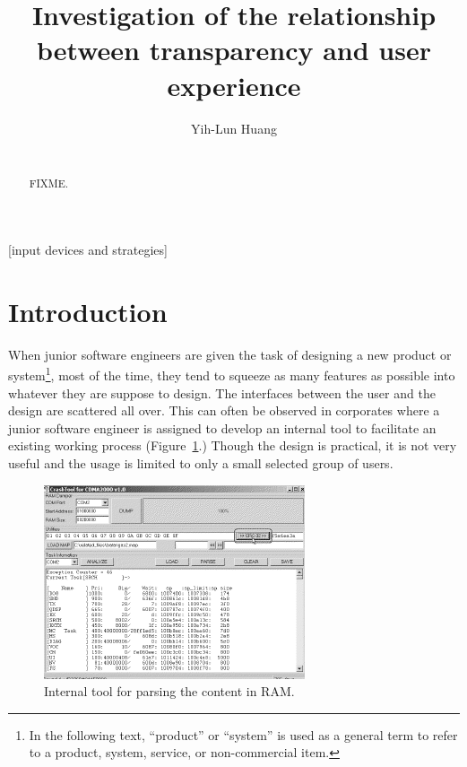 \documentclass{acm_proc_article-sp}
\begin{document}
\title{Investigation of the relationship between transparency and user
  experience}

\author{
\alignauthor Yih-Lun Huang\\
\\
}

\maketitle
\begin{abstract}
FIXME.
\end{abstract}

[input devices and strategies]



\section{Introduction}
When junior software engineers are given the task of designing a new
product or system\footnote{In the following text, ``product'' or
  ``system'' is used as a general term to refer to a product, system,
  service, or non-commercial item.}, most of the time, they tend to
squeeze as many features as possible into whatever they are suppose to
design. The interfaces between the user and the design are scattered
all over. This can often be observed in corporates where a junior
software engineer is assigned to develop an internal tool to
facilitate an existing working process (Figure~\ref{fig:featureful}.)
Though the design is practical, it is not very useful and the usage is
limited to only a small selected group of users.

\begin{figure}[!t]
\centering
\includegraphics[width=.7\columnwidth]{featureful}
\caption{Internal tool for parsing the content in RAM.}
\label{fig:featureful}
\end{figure}
\end{document}
